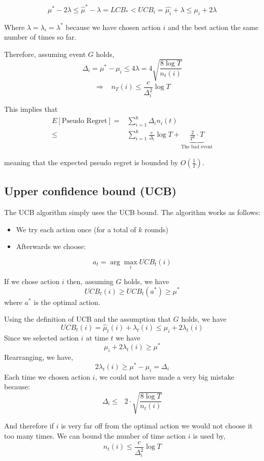 \[
\mu^{*}-2\lambda\le\hat{\mu}^{*}-\lambda=LCB_{*}<UCB_{i}=\hat{\mu_{i}}+\lambda\leq\mu_{i}+2\lambda
\]

Where $\lambda=\lambda_{i}=\lambda^{*}$ because we have chosen
action $i$ and the best action the same number of times so far.

Therefore, assuming event $G$ holds,
\[
\Delta_{i}=\mu^{*}-\mu_{i}\le4\lambda=4\sqrt{\frac{8\log
T}{n_{t}(i)}}
\]
\[
\Rightarrow\;\;\; n_{T}(i)\le\frac{c}{\Delta_{i}^{2}}\log T
\]

This implies that
\begin{align*}
E\left[\text{Pseudo Regret}\right]  = &  \sum_{i=1}^{k}\Delta_{i}n_{i}(t)\\
  \le &  \sum_{i=1}^{k}\frac{c}{\Delta_{i}}\log T
  +\underbrace{\frac{2}{T^{2}}\cdot T}_{\text{The bad event}}
\end{align*}

meaning that the expected pseudo regret is bounded by $O\left(\frac{1}{T}\right)$.

\subsection{Upper confidence bound (UCB)}

The UCB algorithm simply uses the UCB bound. The algorithm works as
follows:
\begin{itemize}
\item We try each action once (for a total of $k$ rounds)
\item Afterwards we choose:
\end{itemize}
\[
a_{t}=\arg\max_{i}UCB_t(i)
\]

If we chose action $i$ then, assuming $G$ holds, we have
\[
UCB_{t}(i)  \ge  UCB_t(a^*)\geq\mu^{*}
\]
where $a^*$ is the optimal action.

Using the definition of UCB and the assumption that $G$ holds, we
have
\[
UCB_t(i)=\hat{\mu}_{t}(i)+\lambda_{t}(i)\le\mu_{i}+2\lambda_{t}(i)
\]
Since we selected action $i$ at time $t$ we have
\[
\mu_{i}+2\lambda_{t}(i)\ge\mu^{*}
\]
Rearranging, we have,
\[
2\lambda_t(i)\ge\mu^{*}-\mu_{i}=\Delta_{i}
\]
Each time we chosen action $i$, we could not have made a very big
mistake because:
\[
\Delta_{i}\leq\text{ }2\cdot\sqrt{\frac{8\log T}{n_{t}(i)}}
\]

And therefore if $i$ is very far off from the optimal action we
would not choose it too many times. We can bound the number of time
action $i$ is used by,
\[
n_{t}(i)\leq\frac{c}{\Delta_{i}^{2}}\log T
\]


